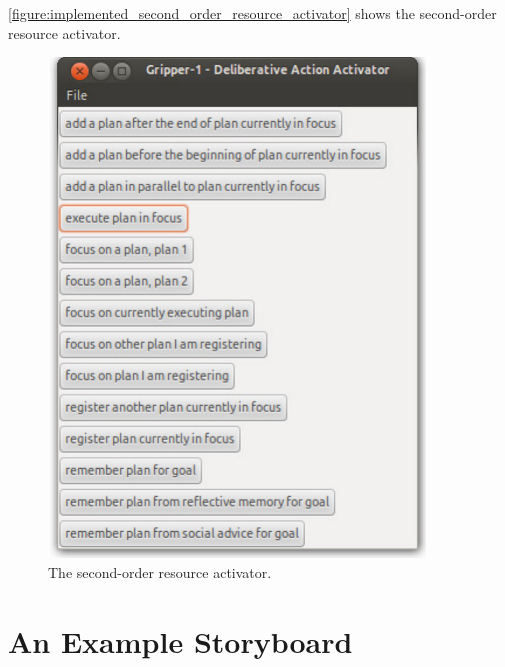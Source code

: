 {\mbox{\autoref{figure:implemented_second_order_resource_activator}}}
shows the second-order resource activator.
\begin{figure}
\begin{center}
\includegraphics[width=10cm]{gfx/implemented_second_order_resource_activator}
\end{center}
\caption[The second-order resource activator.]{The second-order
  resource activator.}
\label{figure:implemented_second_order_resource_activator}
\end{figure}

\section{An Example Storyboard}

